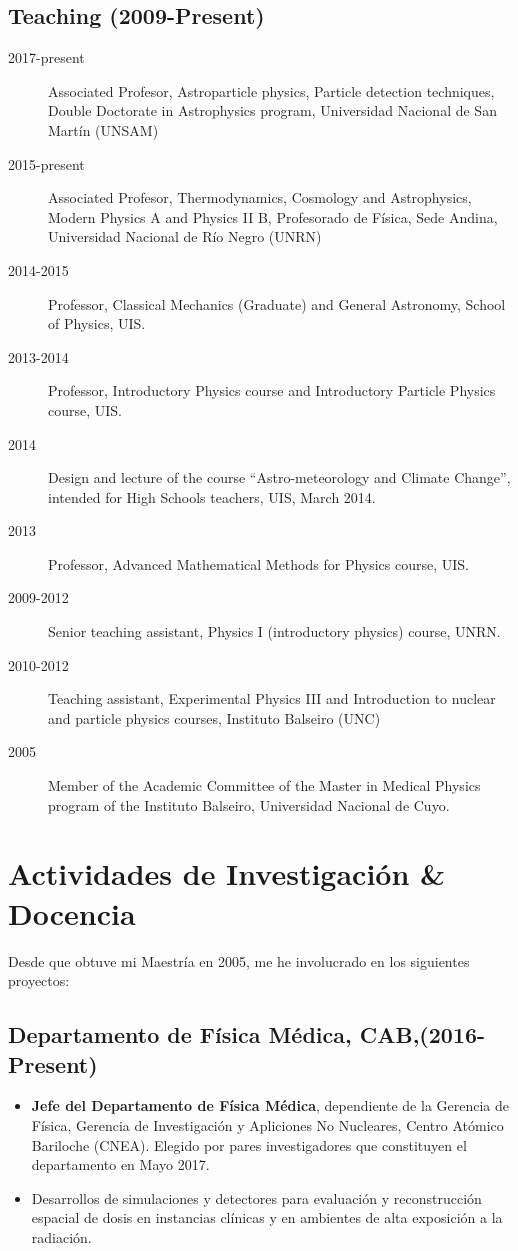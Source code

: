 \subsection*{Teaching (2009-Present)}
\begin{description}
	\item[2017-present] Associated Profesor, Astroparticle physics, Particle detection techniques, Double Doctorate in Astrophysics program, Universidad Nacional de San Martín (UNSAM)
	\item[2015-present] Associated Profesor, Thermodynamics, Cosmology and Astrophysics, Modern Physics A and Physics II B, Profesorado de Física, Sede Andina, Universidad Nacional de Río Negro (UNRN)
	\item[2014-2015] Professor, Classical Mechanics (Graduate) and General Astronomy, School of Physics, UIS.
	\item[2013-2014] Professor, Introductory Physics course and Introductory Particle Physics course, UIS.
	\item[2014] Design and lecture of the course ``Astro-meteorology and Climate Change'', intended for High Schools teachers, UIS, March 2014.
	\item[2013] Professor, Advanced Mathematical Methods for Physics course, UIS.
	\item[2009-2012] Senior teaching assistant, Physics I (introductory physics) course, UNRN.
	\item[2010-2012] Teaching assistant, Experimental Physics III and Introduction to nuclear and particle physics courses, Instituto Balseiro (UNC)
	\item[2005] Member of the Academic Committee of the Master in Medical Physics program of the Instituto Balseiro, Universidad Nacional de Cuyo.
\end{description}
\else
\section*{Actividades de Investigación \& Docencia}

Desde que obtuve mi Maestría en 2005, me he involucrado en los siguientes proyectos:

\subsection*{Departamento de Física Médica, CAB,(2016-Present)}

\begin{itemize}
	\item {\bf{Jefe del Departamento de Física Médica}}, dependiente de la
		Gerencia de Física, Gerencia de Investigación y Apliciones No
		Nucleares, Centro Atómico Bariloche (CNEA). Elegido por pares
		investigadores que constituyen el departamento en Mayo 2017.
	\item Desarrollos de simulaciones y detectores para evaluación y
		reconstrucción espacial de dosis en instancias clínicas y en ambientes
		de alta exposición a la radiación.
\end{itemize}

